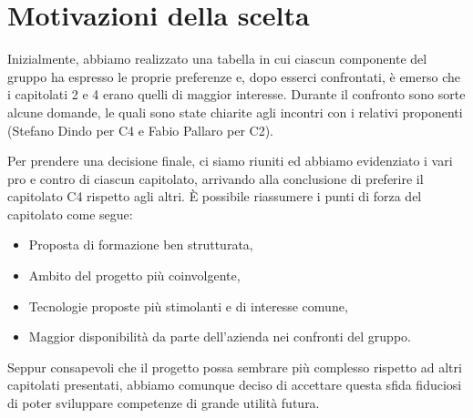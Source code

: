 \section{Motivazioni della scelta}
Inizialmente, abbiamo realizzato una tabella in cui ciascun componente del gruppo ha espresso le proprie preferenze e, dopo esserci confrontati, è emerso che i capitolati 2 e 4 erano quelli di maggior interesse. Durante il confronto sono sorte alcune domande, le quali sono state chiarite agli incontri con i relativi proponenti (Stefano Dindo per C4 e Fabio Pallaro per C2).

Per prendere una decisione finale, ci siamo riuniti ed abbiamo evidenziato i vari pro e contro di ciascun capitolato, arrivando alla conclusione di preferire il capitolato C4 rispetto agli altri. È possibile riassumere i punti di forza del capitolato come segue: 
\begin{itemize}
	\item Proposta di formazione ben strutturata,
	\item Ambito del progetto più coinvolgente,
	\item Tecnologie proposte più stimolanti e di interesse comune,
	\item Maggior disponibilità da parte dell’azienda nei confronti del gruppo.
\end{itemize}
Seppur consapevoli che il progetto possa sembrare più complesso rispetto ad altri capitolati presentati, abbiamo comunque deciso di accettare questa sfida fiduciosi di poter sviluppare competenze di grande utilità futura.



